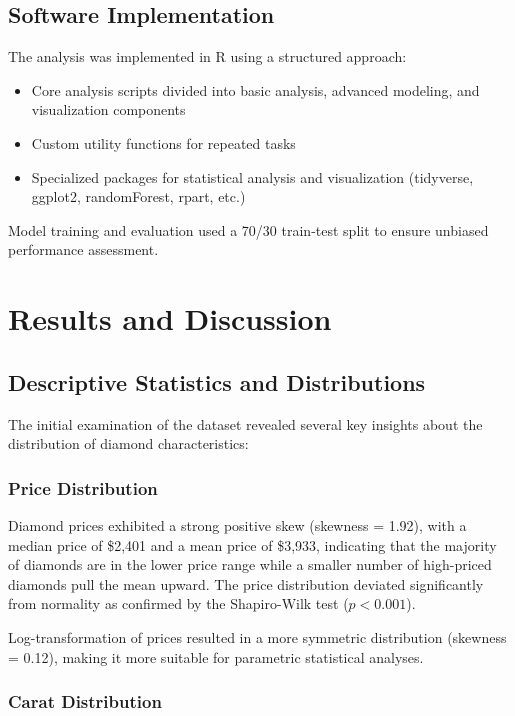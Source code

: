 \documentclass[11pt,a4paper]{article}
\begin{document}
\subsection{Software Implementation}

The analysis was implemented in R using a structured approach:

\begin{itemize}
    \item Core analysis scripts divided into basic analysis, advanced modeling, and visualization components
    \item Custom utility functions for repeated tasks
    \item Specialized packages for statistical analysis and visualization (tidyverse, ggplot2, randomForest, rpart, etc.)
\end{itemize}

Model training and evaluation used a 70/30 train-test split to ensure unbiased performance assessment.

\section{Results and Discussion}

\subsection{Descriptive Statistics and Distributions}

The initial examination of the dataset revealed several key insights about the distribution of diamond characteristics:

\subsubsection{Price Distribution}

Diamond prices exhibited a strong positive skew (skewness = 1.92), with a median price of \$2,401 and a mean price of \$3,933, indicating that the majority of diamonds are in the lower price range while a smaller number of high-priced diamonds pull the mean upward. The price distribution deviated significantly from normality as confirmed by the Shapiro-Wilk test ($p < 0.001$).

Log-transformation of prices resulted in a more symmetric distribution (skewness = 0.12), making it more suitable for parametric statistical analyses.

\subsubsection{Carat Distribution}
\end{document}
